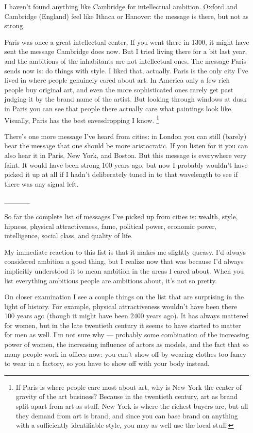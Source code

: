 I haven't found anything like Cambridge for intellectual ambition.
Oxford and Cambridge (England) feel like Ithaca or Hanover: the message
is there, but not as strong.

Paris was once a great intellectual center. If you went there in 1300,
it might have sent the message Cambridge does now. But I tried living
there for a bit last year, and the ambitions of the inhabitants are not
intellectual ones. The message Paris sends now is: do things with style.
I liked that, actually. Paris is the only city I've lived in where
people genuinely cared about art. In America only a few rich people buy
original art, and even the more sophisticated ones rarely get past
judging it by the brand name of the artist. But looking through windows
at dusk in Paris you can see that people there actually care what
paintings look like. Visually, Paris has the best eavesdropping I know.
\footnote{If Paris is where people care most about art, why is New York
the center of gravity of the art business? Because in the twentieth
century, art as brand split apart from art as stuff. New York is where
the richest buyers are, but all they demand from art is brand, and since
you can base brand on anything with a sufficiently identifiable style,
you may as well use the local stuff.}

There's one more message I've heard from cities: in London you can still
(barely) hear the message that one should be more aristocratic. If you
listen for it you can also hear it in Paris, New York, and Boston. But
this message is everywhere very faint. It would have been strong 100
years ago, but now I probably wouldn't have picked it up at all if I
hadn't deliberately tuned in to that wavelength to see if there was any
signal left.

\_\_\_\_\_

So far the complete list of messages I've picked up from cities is:
wealth, style, hipness, physical attractiveness, fame, political power,
economic power, intelligence, social class, and quality of life.

My immediate reaction to this list is that it makes me slightly queasy.
I'd always considered ambition a good thing, but I realize now that was
because I'd always implicitly understood it to mean ambition in the
areas I cared about. When you list everything ambitious people are
ambitious about, it's not so pretty.

On closer examination I see a couple things on the list that are
surprising in the light of history. For example, physical attractiveness
wouldn't have been there 100 years ago (though it might have been 2400
years ago). It has always mattered for women, but in the late twentieth
century it seems to have started to matter for men as well. I'm not sure
why --- probably some combination of the increasing power of women, the
increasing influence of actors as models, and the fact that so many
people work in offices now: you can't show off by wearing clothes too
fancy to wear in a factory, so you have to show off with your body
instead.

